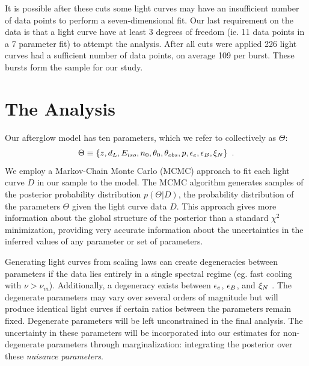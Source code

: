 It is possible after these cuts some light curves may have an insufficient number of data points to perform a seven-dimensional fit.  Our last requirement on the data is that a light curve have at least 3 degrees of freedom (ie. 11 data points in a 7 parameter fit) to attempt the analysis.  After all cuts were applied 226 light curves had a sufficient number of data points, on average 109 per burst.  These bursts form the sample for our study.



\section{The Analysis}

Our afterglow model has ten parameters, which we refer to collectively as $\Theta$:
\begin{equation}
	\Theta \equiv \left \{  z, d_L, E_{iso}, n_0, \theta_0, \theta_{obs}, p, \epsilon_e, \epsilon_B, \xi_N \right \} \ .
\end{equation}
We employ a Markov-Chain Monte Carlo (MCMC) approach to fit each light curve $D$ in our sample to the model.  The MCMC algorithm generates samples of the posterior probability distribution $p(\Theta | D)$, the probability distribution of the parameters $\Theta$ given the light curve data $D$.  This approach gives more information about the global structure of the posterior than a standard $\chi^2$ minimization, providing very accurate information about the uncertainties in the inferred values of any parameter or set of parameters.

Generating light curves from scaling laws can create degeneracies between parameters if the data lies entirely in a single spectral regime (eg. fast cooling with $\nu > \nu_m$).  Additionally, a degeneracy exists between $\epsilon_e$, $\epsilon_B$, and $\xi_N$ \citep{Eichler05}.  The degenerate parameters may vary over several orders of magnitude but will produce identical light curves if certain ratios between the parameters remain fixed.  Degenerate parameters will be left unconstrained in the final analysis.  The uncertainty in these parameters will be incorporated into our estimates for non-degenerate parameters through marginalization: integrating the posterior over these \emph{nuisance parameters}.

